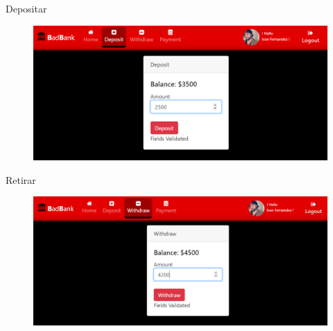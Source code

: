 \documentclass[xcolor=pdftex,dvipsnames,table]{beamer}
\begin{document}
\begin{frame}{Depositar}
    \begin{figure}[htb]
        \centering
        \captionsetup{justification=centering,margin=0.3cm}
        \includegraphics[width=1\linewidth]{func/depostiar.png}
    \end{figure}
\end{frame}
\begin{frame}{Retirar}
    \begin{figure}[htb]
        \centering
        \captionsetup{justification=centering,margin=0.3cm}
        \includegraphics[width=1\linewidth]{func/retirar.png}
    \end{figure}
\end{frame}
\end{document}
